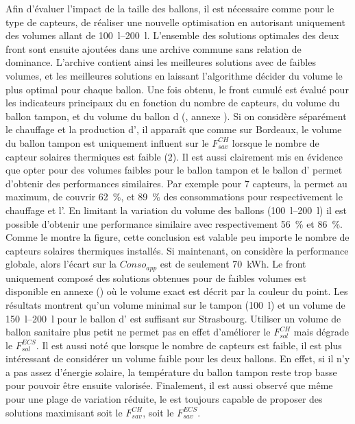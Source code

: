 Afin d’évaluer l’impact de la taille des ballons, il est nécessaire comme pour le type
de capteurs, de réaliser une nouvelle optimisation en autorisant uniquement des volumes allant
de \SIrange{100}{200}{\litre}. L’ensemble des solutions optimales des deux front sont ensuite
ajoutées dans une archive commune sans relation de dominance. L’archive contient ainsi les meilleures
solutions avec de faibles volumes, et les meilleures solutions en laissant l’algorithme décider
du volume le plus optimal pour chaque ballon.
Une fois obtenu, le front cumulé est évalué pour les indicateurs principaux du 
en fonction du nombre de capteurs, du volume du ballon tampon, et du volume du ballon d
(, annexe ).
Si on considère séparément le chauffage et la production d’,
il apparaît que comme sur Bordeaux, le volume du ballon tampon est uniquement influent
sur le $F_{sav}^{CH}$ lorsque le nombre de capteur solaires thermiques est faible ($2$).
Il est aussi clairement mis en évidence que opter pour des volumes faibles pour le
ballon tampon et le ballon d’ permet d’obtenir des performances similaires.
Par exemple pour $7$ capteurs, la  permet au maximum, de couvrir
\SI{62}{\percent}, et \SI{89}{\percent} des consommations pour respectivement le chauffage et l’.
En limitant la variation du volume des ballons (\SIrange{100}{200}{\litre}) il est possible d’obtenir
une performance similaire avec respectivement
\SI{56}{\percent} et \SI{86}{\percent}. Comme le montre la figure, cette conclusion est valable
peu importe le nombre de capteurs solaires thermiques installés. Si maintenant, on considère
la performance globale, alors l’écart sur la $Conso_{app}$ est de seulement \SI{70}{kWh}.
Le front uniquement composé des solutions obtenues pour de faibles volumes est disponible
en annexe () où le volume exact est décrit par
la couleur du point. Les résultats montrent qu’un volume minimal sur le tampon (\SI{100}{\litre})
et un volume de \SIrange{150}{200}{\litre} pour le ballon d’ est suffisant sur Strasbourg.
Utiliser un volume de ballon sanitaire plus petit ne permet pas en effet d’améliorer le
$F_{sol}^{CH}$ mais dégrade le $F_{sol}^{ECS}$.
Il est aussi noté que lorsque le nombre de capteurs est faible, il est plus intéressant de
considérer un volume faible pour les deux ballons. En effet, si il n’y a pas assez
d’énergie solaire, la température du ballon tampon reste trop basse pour pouvoir être
ensuite valorisée. Finalement, il est aussi observé que même pour une plage de variation
réduite, le  est toujours capable de proposer des solutions maximisant soit le
$F_{sav}^{CH}$, soit le $F_{sav}^{ECS}$.

